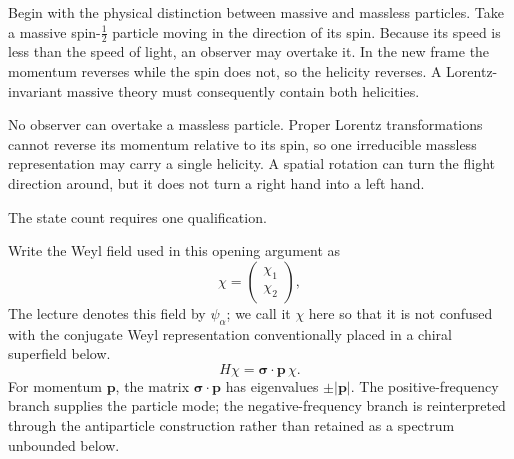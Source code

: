 Begin with the physical distinction between massive and massless particles. Take a massive spin-\(\tfrac12\) particle moving in the direction of its spin. Because its speed is less than the speed of light, an observer may overtake it. In the new frame the momentum reverses while the spin does not, so the helicity reverses. A Lorentz-invariant massive theory must consequently contain both helicities.

No observer can overtake a massless particle. Proper Lorentz transformations cannot reverse its momentum relative to its spin, so one irreducible massless representation may carry a single helicity. A spatial rotation can turn the flight direction around, but it does not turn a right hand into a left hand.

\begin{classroomqa}
\end{classroomqa}

The state count requires one qualification.

Write the Weyl field used in this opening argument as
\begin{equation}
\chi=
\begin{pmatrix}
\chi_1\\
\chi_2
\end{pmatrix},
\end{equation}
The lecture denotes this field by \(\psi_\alpha\); we call it \(\chi\) here so that it is not confused with the conjugate Weyl representation conventionally placed in a chiral superfield below.
\begin{equation}
H\chi=\boldsymbol{\sigma}\cdot\mathbf p\,\chi.
\label{eq:l8-weyl-hamiltonian}
\end{equation}
For momentum \(\mathbf p\), the matrix \(\boldsymbol{\sigma}\cdot\mathbf p\) has eigenvalues \(\pm|\mathbf p|\). The positive-frequency branch supplies the particle mode; the negative-frequency branch is reinterpreted through the antiparticle construction rather than retained as a spectrum unbounded below.

